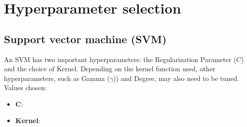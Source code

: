 \section{Hyperparameter selection}
\subsection{Support vector machine (SVM)}
An SVM has two important hyperparameters: the Regularization Parameter (\(C\)) and the choice of Kernel. 
Depending on the kernel function used, other hyperparameters, such as Gamma (\(\gamma\))) and Degree, may also need to be tuned.
 Values chosen:
\begin{itemize}
    \item \textbf{\(\boldsymbol{C}\)}:
    \item \textbf{Kernel}:
\end{itemize}


 
